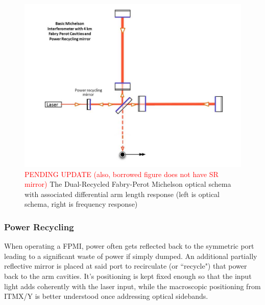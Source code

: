 \begin{figure}[H]
\begin{center}
\includegraphics[width=\textwidth]{figs/INTRO/tempsub_Basic_michelson_with_FP_and_PR_labeled.jpg}
\end{center}
\caption{\textcolor{red}{PENDING UPDATE (also, borrowed figure does not have SR mirror)} The Dual-Recycled Fabry-Perot Michelson optical schema with associated differential arm length response (left is optical schema, right is frequency response)}
\label{fig:drfp_michelson}
\end{figure}


\subsubsection{Power Recycling}
When operating a FPMI, power often gets reflected back to the symmetric port leading to a significant waste of power if simply dumped. An additional partially reflective mirror is placed at said port to recirculate (or ``recycle") that power back to the arm cavities. It's positioning is kept fixed enough so that the input light adds coherently with the laser input, while the macroscopic positioning from ITMX/Y is better understood once addressing optical sidebands.

